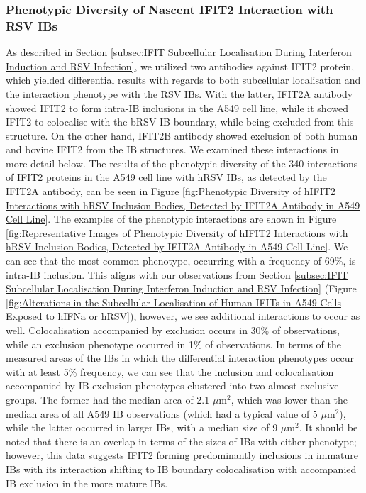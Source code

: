 \subsubsection{Phenotypic Diversity of Nascent IFIT2 Interaction with RSV IBs}
As described in Section \ref{subsec:IFIT Subcellular Localisation During Interferon Induction and RSV Infection}, we utilized two antibodies against IFIT2 protein, which yielded differential results with regards to both subcellular localisation and the interaction phenotype with the RSV IBs. With the latter, IFIT2A antibody showed IFIT2 to form intra-IB inclusions in the A549 cell line, while it showed IFIT2 to colocalise with the bRSV IB boundary, while being excluded from this structure. On the other hand, IFIT2B antibody showed exclusion of both human and bovine IFIT2 from the IB structures. We examined these interactions in more detail below. The results of the phenotypic diversity of the 340 interactions of IFIT2 proteins in the A549 cell line with hRSV IBs, as detected by the IFIT2A antibody, can be seen in Figure \ref{fig:Phenotypic Diversity of hIFIT2 Interactions with hRSV Inclusion Bodies, Detected by IFIT2A Antibody in A549 Cell Line}. The examples of the phenotypic interactions are shown in Figure \ref{fig:Representative Images of Phenotypic Diversity of hIFIT2 Interactions with hRSV Inclusion Bodies, Detected by IFIT2A Antibody in A549 Cell Line}. We can see that the most common phenotype, occurring with a frequency of 69\%, is intra-IB inclusion. This aligns with our observations from Section \ref{subsec:IFIT Subcellular Localisation During Interferon Induction and RSV Infection} (Figure \ref{fig:Alterations in the Subcellular Localisation of Human IFITs in A549 Cells Exposed to hIFNa or hRSV}), however, we see additional interactions to occur as well. Colocalisation accompanied by exclusion occurs in 30\% of observations, while an exclusion phenotype occurred in 1\% of observations. In terms of the measured areas of the IBs in which the differential interaction phenotypes occur with at least 5\% frequency, we can see that the inclusion and colocalisation accompanied by IB exclusion phenotypes clustered into two almost exclusive groups. The former had the median area of 2.1 \(\mu \mbox{m}^2\), which was lower than the median area of all A549 IB observations (which had a typical value of 5 \(\mu \mbox{m}^2\)), while the latter occurred in larger IBs, with a median size of 9 \(\mu \mbox{m}^2\). It should be noted that there is an overlap in terms of the sizes of IBs with either phenotype; however, this data suggests IFIT2 forming predominantly inclusions in immature IBs with its interaction shifting to IB boundary colocalisation with accompanied IB exclusion in the more mature IBs.

